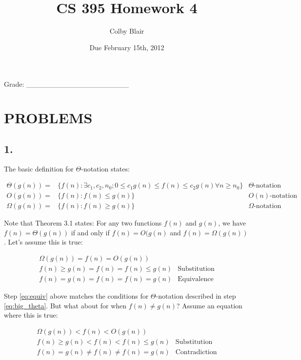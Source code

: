 \documentclass[11pt,letterpaper]{article}
\date{Due February 15th, 2012}
\title{CS 395 Homework 4}
\author{Colby Blair}
\begin{document}
\maketitle

\begin{center}

Grade: \_\_\_\_\_\_\_\_\_\_\_\_\_\_\_\_\_\_\_\_
\end{center}

\thispagestyle{empty}

\pagebreak


\section*{PROBLEMS}

\subsection*{1.}
The basic definition for $\Theta$-notation states:

\small
\begin{eqnarray}
\Theta(g(n)) =		& \{f(n) : \exists c_1, c_2, n_0; 0 \leq c_1g(n) \leq f(n) \leq c_2 g(n)  \forall  n \geq n_0 \} 	
					& \Theta\mbox{-notation Definition} \label{eq:big_theta} \\
O(g(n)) =			& \{f(n): f(n) \leq g(n) \} 
					& O(n)\mbox{-notation Definition} \\
\Omega(g(n)) = 	& \{f(n): f(n) \geq g(n) \}
					& \Omega\mbox{-notation Definition} %
\end{eqnarray}
\normalsize

Note that Theorem 3.1 states: For any two functions $f(n)$ and $g(n)$, we have $f(n) = \Theta(g(n))$ if and
 only if $f(n) = O(g(n)$ and $f(n) = \Omega(g(n))$. Let's assume this is true:

\begin{eqnarray}
\Omega(g(n)) = f(n) = O(g(n)) 
				& \\
f(n) \geq g(n) = f(n) = f(n) \leq g(n) 
				& \mbox{Substitution} \\
f(n) = g(n) = f(n) = f(n) = g(n) 
				& \mbox{Equivalence} \label{eq:equiv}
\end{eqnarray}

Step \ref{eq:equiv} above matches the conditions for $\Theta$-notation described in step \ref{eq:big_theta}.
But what about for when $f(n) \neq g(n)$? Assume an equation where this is true:

\begin{eqnarray}
\Omega(g(n)) < f(n) < O(g(n)) 
				& \label{eq:contra_hypo}\\
f(n) \geq g(n) < f(n) < f(n) \leq g(n) 
				& \mbox{Substitution} \\
f(n) = g(n) \neq f(n) \neq f(n) = g(n) 
				& \mbox{Contradiction} \label{eq:contra}
\end{eqnarray}
\end{document}

